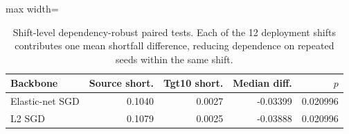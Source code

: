 \begin{table}[!tbp]
\centering
\caption{Shift-level dependency-robust paired tests. Each of the 12 deployment shifts contributes one mean shortfall difference, reducing dependence on repeated seeds within the same shift.}
\label{tab:shift_level_tests}
\footnotesize
\setlength{\tabcolsep}{3pt}
\begin{adjustbox}{max width=\columnwidth}
\begin{tabular}{lrrrr}
\toprule
Backbone & Source short. & Tgt10 short. & Median diff. & $p$ \\
\midrule
Elastic-net SGD & 0.1040 & 0.0027 & -0.03399 & 0.020996 \\
L2 SGD & 0.1079 & 0.0025 & -0.03888 & 0.020996 \\
\bottomrule
\end{tabular}
\end{adjustbox}
\end{table}
